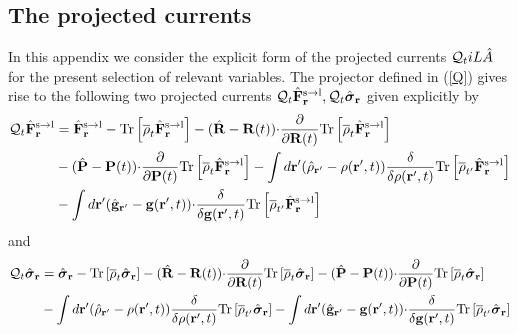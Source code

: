\documentclass[b5paper,openright,10pt]{book}
\begin{document}
\begin{appendices}
\chapter{The projected currents}
\label{Ap:Projected}
In  this appendix  we  consider  the explicit  form  of the  projected
currents  ${\cal  Q}_tiL\hat{A}$  for  the  present  selection  of  relevant
variables.   The projector  defined  in (\ref{Q})  gives  rise to  the
following  two projected  currents  ${\cal  Q}_t\hat{\bf F}^{\rm  s\to
  l}_{{\bf r}},  {\cal Q}_t\hat{\boldsymbol{\sigma}}_{{\bf  r}}$ given
explicitly by
\begin{align}
  {\cal Q}_t\hat{\bf F}^{\rm s\to l}_{{\bf r}}&=
\hat{\bf F}^{\rm s\to l}_{{\bf r}}- {\rm Tr}\left[\overline{\rho}_{t} \hat{\bf F}^{\rm s\to l}_{{\bf r}}\right]
-(\hat{\bf R}-{\bf R}(t)){\cdot}\frac{\partial}{\partial {\bf R}(t)}
{\rm Tr}\left[\overline{\rho}_{t} \hat{\bf F}^{\rm s\to l}_{{\bf r}}\right]
\nonumber \\
&-(\hat{\bf P}-{\bf P}(t)){\cdot}\frac{\partial}{\partial {\bf P}(t)}
{\rm Tr}\left[\overline{\rho}_{t} \hat{\bf F}^{\rm s\to l}_{{\bf r}}\right]
-\int d{\bf r}'(\hat{\rho}_{{\bf r}'}-\rho({\bf r}',t))
\frac{\delta}{\delta \rho({\bf r}',t)}{\rm Tr}\left[\overline{\rho}_{t'}  \hat{\bf F}^{\rm s\to l}_{{\bf r}}\right]
\nonumber\\
&-\int d{\bf r}'(\hat{\bf g}_{{\bf r}'}-{\bf g}({\bf r}',t))
{\cdot}\frac{\delta}{\delta {\bf g}({\bf r}',t)}{\rm Tr}\left[\overline{\rho}_{t'}  \hat{\bf F}^{\rm s\to l}_{{\bf r}}\right]
\label{QF0}
\end{align}
and 
\begin{align}
  {\cal Q}_t\hat{\boldsymbol{\sigma}}_{{\bf r}}&=
\hat{\boldsymbol{\sigma}}_{{\bf r}}- {\rm Tr}\left[\overline{\rho}_{t} \hat{\boldsymbol{\sigma}}_{{\bf r}}\right]
-(\hat{\bf R}-{\bf R}(t)){\cdot}\frac{\partial}{\partial {\bf R}(t)}
{\rm Tr}\left[\overline{\rho}_{t} \hat{\boldsymbol{\sigma}}_{{\bf r}}\right]
-(\hat{\bf P}-{\bf P}(t)){\cdot}\frac{\partial}{\partial {\bf P}(t)}
{\rm Tr}\left[\overline{\rho}_{t} \hat{\boldsymbol{\sigma}}_{{\bf r}}\right]
\nonumber\\
&-\int d{\bf r}'(\hat{\rho}_{{\bf r}'}-\rho({\bf r}',t))
\frac{\delta}{\delta \rho({\bf r}',t)}{\rm Tr}\left[\overline{\rho}_{t'}\hat{\boldsymbol{\sigma}}_{{\bf r}}\right]
-\int d{\bf r}'(\hat{\bf g}_{{\bf r}'}-{\bf g}({\bf r}',t))
{\cdot}\frac{\delta}{\delta {\bf g}({\bf r}',t)}{\rm Tr}\left[\overline{\rho}_{t'}  \hat{\boldsymbol{\sigma}}_{{\bf r}}\right]
\label{QS0}
\end{align}

\end{appendices}
\end{document}
